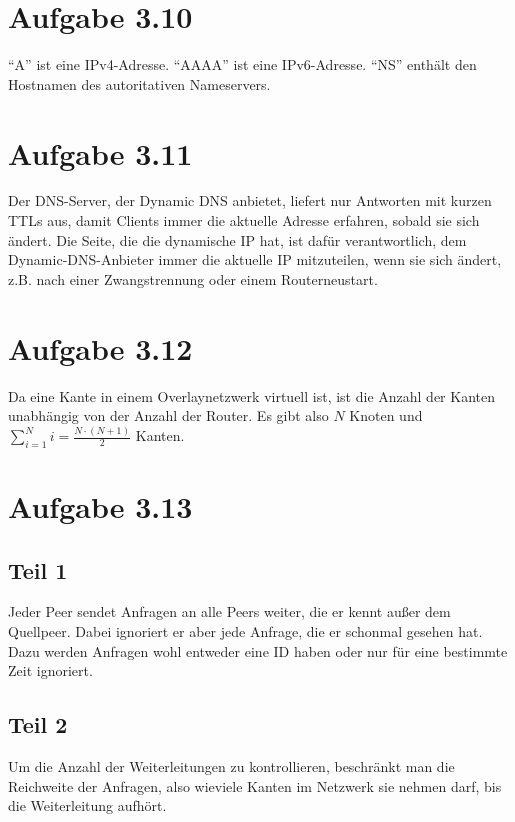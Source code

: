\documentclass[10pt,a4paper]{article}
\begin{document}
\section{Aufgabe 3.10}

``A'' ist eine IPv4-Adresse. ``AAAA'' ist eine IPv6-Adresse. ``NS'' enthält den
Hostnamen des autoritativen Nameservers.

\section{Aufgabe 3.11}

Der DNS-Server, der Dynamic DNS anbietet, liefert nur Antworten mit kurzen TTLs
aus, damit Clients immer die aktuelle Adresse erfahren, sobald sie sich
ändert. Die Seite, die die dynamische IP hat, ist dafür verantwortlich, dem
Dynamic-DNS-Anbieter immer die aktuelle IP mitzuteilen, wenn sie sich ändert,
z.B. nach einer Zwangstrennung oder einem Routerneustart.

\section{Aufgabe 3.12}

Da eine Kante in einem Overlaynetzwerk virtuell ist, ist die Anzahl der Kanten
unabhängig von der Anzahl der Router. Es gibt also $N$ Knoten und
$\sum_{i = 1}^{N} i = \frac{N \cdot (N + 1)}{2}$ Kanten.

\section{Aufgabe 3.13}

\subsection{Teil 1}

Jeder Peer sendet Anfragen an alle Peers weiter, die er kennt außer dem
Quellpeer. Dabei ignoriert er aber jede Anfrage, die er schonmal gesehen
hat. Dazu werden Anfragen wohl entweder eine ID haben oder nur für eine
bestimmte Zeit ignoriert.

\subsection{Teil 2}

Um die Anzahl der Weiterleitungen zu kontrollieren, beschränkt man die
Reichweite der Anfragen, also wieviele Kanten im Netzwerk sie nehmen darf, bis
die Weiterleitung aufhört.
\end{document}
